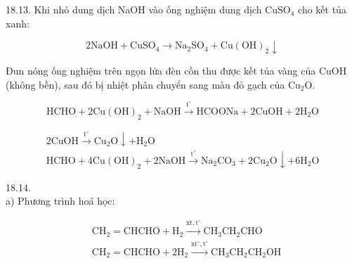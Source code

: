 \documentclass[10pt]{article}
\begin{document}
18.13. Khi nhỏ dung dịch NaOH vào ống nghiệm dung dịch $\mathrm{CuSO}_{4}$ cho kết tủa xanh:

$$
2 \mathrm{NaOH}+\mathrm{CuSO}_{4} \rightarrow \mathrm{Na}_{2} \mathrm{SO}_{4}+\mathrm{Cu}(\mathrm{OH})_{2} \downarrow
$$

Đun nóng ống nghiệm trên ngọn lửa đèn cồn thu được kết tủa vàng của CuOH (không bền), sau đó bị nhiệt phân chuyển sang màu đỏ gạch của $\mathrm{Cu}_{2} \mathrm{O}$.

$$
\mathrm{HCHO}+2 \mathrm{Cu}(\mathrm{OH})_{2}+\mathrm{NaOH} \xrightarrow{\mathrm{t}^{\circ}} \mathrm{HCOONa}+2 \mathrm{CuOH}+2 \mathrm{H}_{2} \mathrm{O}
$$

$$
\begin{gathered}
2 \mathrm{CuOH} \xrightarrow{\mathrm{t}^{\circ}} \mathrm{Cu}_{2} \mathrm{O} \downarrow+\mathrm{H}_{2} \mathrm{O} \\
\mathrm{HCHO}+4 \mathrm{Cu}(\mathrm{OH})_{2}+2 \mathrm{NaOH} \xrightarrow{\mathrm{t}^{\circ}} \mathrm{Na}_{2} \mathrm{CO}_{3}+2 \mathrm{Cu}_{2} \mathrm{O} \downarrow+6 \mathrm{H}_{2} \mathrm{O}
\end{gathered}
$$

18.14.\\
a) Phương trình hoá học:

$$
\begin{aligned}
& \mathrm{CH}_{2}=\mathrm{CHCHO}+\mathrm{H}_{2} \xrightarrow{\mathrm{xt}, \mathrm{t}^{\circ}} \mathrm{CH}_{3} \mathrm{CH}_{2} \mathrm{CHO} \\
& \mathrm{CH}_{2}=\mathrm{CHCHO}+2 \mathrm{H}_{2} \xrightarrow{\mathrm{xt}^{\circ}, \mathrm{t}^{\circ}} \mathrm{CH}_{3} \mathrm{CH}_{2} \mathrm{CH}_{2} \mathrm{OH}
\end{aligned}
$$
\end{document}
